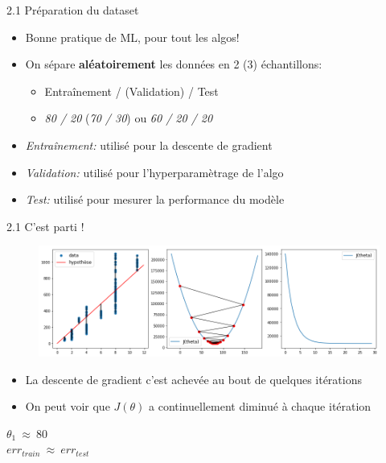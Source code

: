 \begin{frame}{2.1 Préparation du dataset}
  \begin{itemize}
  \item Bonne pratique de ML, pour tout les algos!
  \item On sépare \textbf{aléatoirement} les données en 2 (3) échantillons:
    \begin{itemize}
      \normalsize
    \item Entraînement / (Validation) / Test
    \item \textit{80 / 20} (\textit{70 / 30}) ou \textit{60 / 20 / 20}
    \end{itemize}
    \vspace{0.2cm}
  \item \textit{Entraînement:} utilisé pour la descente de gradient
  \item \textit{Validation:} utilisé pour l'hyperparamètrage de l'algo
  \item \textit{Test:} utilisé pour mesurer la performance du modèle
  \end{itemize}
\end{frame}

\begin{frame}{2.1 C'est parti !}
  \begin{figure}
    \includegraphics[width=\textwidth]{fig/gradDescent.png}
  \end{figure}
  \begin{itemize}
  \item La descente de gradient c'est achevée au bout de quelques itérations
  \item On peut voir que $J(\theta)$ a continuellement diminué à chaque itération
  \end{itemize}
  \begin{center}
    $\theta_{1} ~ \approx ~ 80$ \\
    $err_{train} ~ \approx ~ err_{test}$
  \end{center}
\end{frame}

